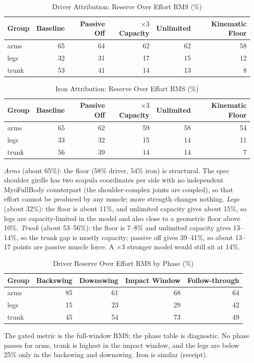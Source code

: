 \documentclass[11pt,a4paper]{article}
\begin{document}
\begin{table}[h]\centering\small
\caption{Driver Attribution: Reserve Over Effort RMS (\%)}
\begin{tabular}{lrrrrr}\toprule Group & Baseline & Passive Off & $\times3$ Capacity & Unlimited & Kinematic Floor \\\midrule
arms & 65 & 64 & 62 & 62 & 58 \\
legs & 32 & 31 & 17 & 15 & 12 \\
trunk & 53 & 41 & 14 & 13 & 8 \\
\bottomrule\end{tabular}\end{table}

\begin{table}[h]\centering\small
\caption{Iron Attribution: Reserve Over Effort RMS (\%)}
\begin{tabular}{lrrrrr}\toprule Group & Baseline & Passive Off & $\times3$ Capacity & Unlimited & Kinematic Floor \\\midrule
arms & 65 & 62 & 59 & 58 & 54 \\
legs & 33 & 32 & 15 & 14 & 11 \\
trunk & 56 & 39 & 14 & 14 & 7 \\
\bottomrule\end{tabular}\end{table}

\noindent \emph{Arms} (about 65\%): the floor (58\% driver, 54\% iron) is structural. The spec shoulder girdle has two scapula coordinates per side with no independent MyoFullBody counterpart (the shoulder-complex joints are coupled), so that effort cannot be produced by any muscle; more strength changes nothing. \emph{Legs} (about 32\%): the floor is about 11\%, and unlimited capacity gives about 15\%, so legs are capacity-limited in the model and also close to a geometric floor above 10\%. \emph{Trunk} (about 53--56\%): the floor is 7--8\% and unlimited capacity gives 13--14\%, so the trunk gap is mostly capacity; passive off gives 39--41\%, so about 13--17 points are passive muscle force. A $\times3$ stronger model would still sit at 14\%.

\begin{table}[h]\centering\small
\caption{Driver Reserve Over Effort RMS by Phase (\%)}
\begin{tabular}{lrrrr}\toprule Group & Backswing & Downswing & Impact Window & Follow-through \\\midrule
arms & 85 & 61 & 68 & 64 \\
legs & 15 & 23 & 29 & 42 \\
trunk & 45 & 54 & 73 & 49 \\
\bottomrule\end{tabular}\end{table}
\noindent The gated metric is the full-window RMS; the phase table is diagnostic. No phase passes for arms, trunk is highest in the impact window, and the legs are below 25\% only in the backswing and downswing. Iron is similar (receipt).
\end{document}
